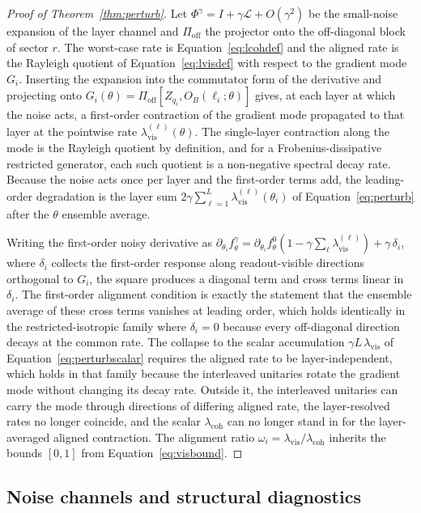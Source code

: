 \documentclass{article}
\newcommand{\lcoh}{\lambda_{\mathrm{coh}}}
\newcommand{\lvis}{\lambda_{\mathrm{vis}}}
\newcommand{\Lop}{\mathcal{L}}
\newcommand{\Pioff}{\Pi_{\mathrm{off}}}
\begin{document}
\begin{proof}[Proof of Theorem~\ref{thm:perturb}]
Let $\Phi^\gamma=I+\gamma\Lop+O(\gamma^2)$ be the small-noise expansion of the layer channel and $\Pioff$ the projector onto the off-diagonal block of sector $r$. The worst-case rate is Equation~\eqref{eq:lcohdef} and the aligned rate is the Rayleigh quotient of Equation~\eqref{eq:lvisdef} with respect to the gradient mode $G_i$. Inserting the expansion into the commutator form of the derivative and projecting onto $G_i(\theta)=\Pioff[Z_{q_i},O_B(\ell_i;\theta)]$ gives, at each layer at which the noise acts, a first-order contraction of the gradient mode propagated to that layer at the pointwise rate $\lvis^{(\ell)}(\theta)$. The single-layer contraction along the mode is the Rayleigh quotient by definition, and for a Frobenius-dissipative restricted generator, each such quotient is a non-negative spectral decay rate. Because the noise acts once per layer and the first-order terms add, the leading-order degradation is the layer sum $2\gamma\sum_{\ell=1}^{L}\lvis^{(\ell)}(\theta_i)$ of Equation~\eqref{eq:perturb} after the $\theta$ ensemble average.

Writing the first-order noisy derivative as $\partial_{\theta_i}f^\gamma_\theta=\partial_{\theta_i}f^0_\theta(1-\gamma\sum_\ell\lvis^{(\ell)})+\gamma\,\delta_i$, where $\delta_i$ collects the first-order response along readout-visible directions orthogonal to $G_i$, the square produces a diagonal term and cross terms linear in $\delta_i$. The first-order alignment condition is exactly the statement that the ensemble average of these cross terms vanishes at leading order, which holds identically in the restricted-isotropic family where $\delta_i=0$ because every off-diagonal direction decays at the common rate. The collapse to the scalar accumulation $\gamma L\,\lvis$ of Equation~\eqref{eq:perturbscalar} requires the aligned rate to be layer-independent, which holds in that family because the interleaved unitaries rotate the gradient mode without changing its decay rate. Outside it, the interleaved unitaries can carry the mode through directions of differing aligned rate, the layer-resolved rates no longer coincide, and the scalar $\lcoh$ can no longer stand in for the layer-averaged aligned contraction. The alignment ratio $\omega_i=\lvis/\lcoh$ inherits the bounds $[0,1]$ from Equation~\eqref{eq:visbound}.
\end{proof}

\subsection{Noise channels and structural diagnostics}
\end{document}

